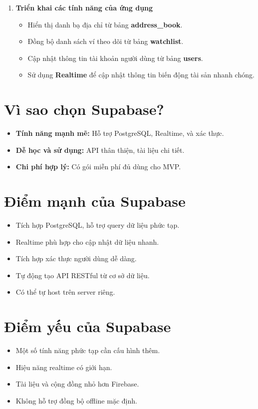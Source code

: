\documentclass[a4paper]{report}
\begin{document}
\begin{enumerate}
    \item \textbf{Triển khai các tính năng của ứng dụng}
    \begin{itemize}
        \item Hiển thị danh bạ địa chỉ từ bảng \textbf{address\_book}.
        \item Đồng bộ danh sách ví theo dõi từ bảng \textbf{watchlist}.
        \item Cập nhật thông tin tài khoản người dùng từ bảng \textbf{users}.
        \item Sử dụng \textbf{Realtime} để cập nhật thông tin biến động tài sản nhanh chóng.
    \end{itemize}
\end{enumerate}

\section*{Vì sao chọn Supabase?}
\begin{itemize}
    \item \textbf{Tính năng mạnh mẽ:} Hỗ trợ PostgreSQL, Realtime, và xác thực.
    \item \textbf{Dễ học và sử dụng:} API thân thiện, tài liệu chi tiết.
    \item \textbf{Chi phí hợp lý:} Có gói miễn phí đủ dùng cho MVP.
\end{itemize}

\section*{Điểm mạnh của Supabase}
\begin{itemize}
    \item Tích hợp PostgreSQL, hỗ trợ query dữ liệu phức tạp.
    \item Realtime phù hợp cho cập nhật dữ liệu nhanh.
    \item Tích hợp xác thực người dùng dễ dàng.
    \item Tự động tạo API RESTful từ cơ sở dữ liệu.
    \item Có thể tự host trên server riêng.
\end{itemize}

\section*{Điểm yếu của Supabase}
\begin{itemize}
    \item Một số tính năng phức tạp cần cấu hình thêm.
    \item Hiệu năng realtime có giới hạn.
    \item Tài liệu và cộng đồng nhỏ hơn Firebase.
    \item Không hỗ trợ đồng bộ offline mặc định.
\end{itemize}
\end{document}
